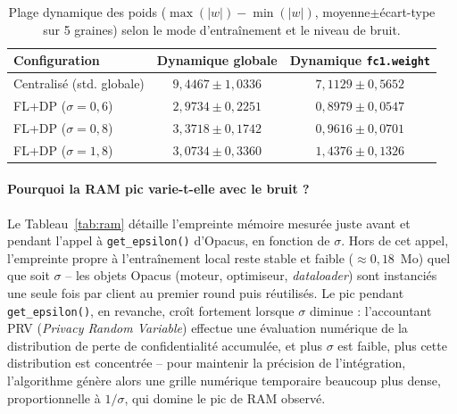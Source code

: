 \documentclass{acmart}
\begin{document}
\begin{table}[h!]
\centering
\small
\caption{Plage dynamique des poids ($\max(|w|)-\min(|w|)$, moyenne$\pm$écart-type sur
5 graines) selon le mode d'entraînement et le niveau de bruit.}
\label{tab:dynrange}
\begin{tabular}{lcc}
\toprule
Configuration & Dynamique globale & Dynamique \texttt{fc1.weight} \\
\midrule
Centralisé (std. globale)  & $9{,}4467\pm1{,}0336$ & $7{,}1129\pm0{,}5652$ \\
FL+DP ($\sigma=0{,}6$)     & $2{,}9734\pm0{,}2251$ & $0{,}8979\pm0{,}0547$ \\
FL+DP ($\sigma=0{,}8$)     & $3{,}3718\pm0{,}1742$ & $0{,}9616\pm0{,}0701$ \\
FL+DP ($\sigma=1{,}8$)     & $3{,}0734\pm0{,}3360$ & $1{,}4376\pm0{,}1326$ \\
\bottomrule
\end{tabular}
\end{table}

\paragraph{Pourquoi la RAM pic varie-t-elle avec le bruit ?} Le Tableau~\ref{tab:ram}
détaille l'empreinte mémoire mesurée juste avant et pendant l'appel à
\texttt{get\_epsilon()} d'Opacus, en fonction de $\sigma$. Hors de cet appel,
l'empreinte propre à l'entraînement local reste stable et faible
($\approx0{,}18$~Mo) quel que soit $\sigma$ -- les objets Opacus (moteur, optimiseur,
\textit{dataloader}) sont instanciés une seule fois par client au premier round puis
réutilisés. Le pic pendant \texttt{get\_epsilon()}, en revanche, croît fortement
lorsque $\sigma$ diminue : l'accountant PRV (\textit{Privacy Random Variable})
effectue une évaluation numérique de la distribution de perte de confidentialité
accumulée, et plus $\sigma$ est faible, plus cette distribution est concentrée --
pour maintenir la précision de l'intégration, l'algorithme génère alors une grille
numérique temporaire beaucoup plus dense, proportionnelle à $1/\sigma$, qui domine le
pic de RAM observé.
\end{document}
